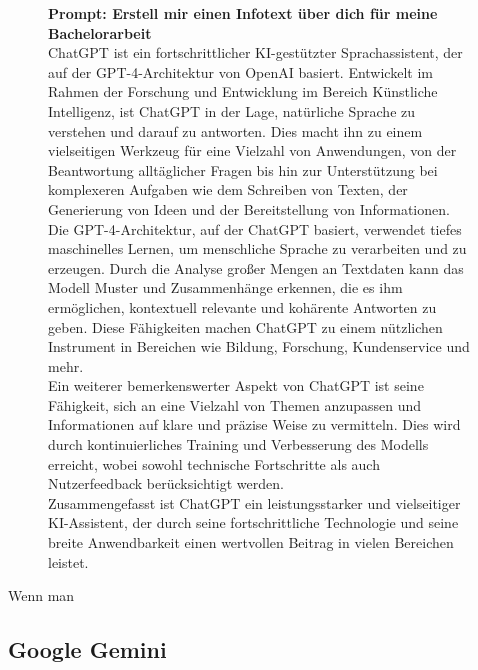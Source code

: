 \begin{figure}[H] 
    \begin{tcolorbox}[colback=gray!20, colframe=gray!20, boxrule=0pt, sharp corners] 
    \textbf{Prompt: Erstell mir einen Infotext über dich für meine Bachelorarbeit}\\ 

    ChatGPT ist ein fortschrittlicher KI-gestützter Sprachassistent, der auf der GPT-4-Architektur von OpenAI basiert. 
    Entwickelt im Rahmen der Forschung und Entwicklung im Bereich Künstliche Intelligenz, ist ChatGPT in der Lage, 
    natürliche Sprache zu verstehen und darauf zu antworten. Dies macht ihn zu einem vielseitigen Werkzeug für eine 
    Vielzahl von Anwendungen, von der Beantwortung alltäglicher Fragen bis hin zur Unterstützung bei komplexeren 
    Aufgaben wie dem Schreiben von Texten, der Generierung von Ideen und der Bereitstellung von Informationen.\\
    
    Die GPT-4-Architektur, auf der ChatGPT basiert, verwendet tiefes maschinelles Lernen, um menschliche Sprache zu 
    verarbeiten und zu erzeugen. Durch die Analyse großer Mengen an Textdaten kann das Modell Muster und Zusammenhänge 
    erkennen, die es ihm ermöglichen, kontextuell relevante und kohärente Antworten zu geben. Diese Fähigkeiten machen 
    ChatGPT zu einem nützlichen Instrument in Bereichen wie Bildung, Forschung, Kundenservice und mehr.\\
    
    Ein weiterer bemerkenswerter Aspekt von ChatGPT ist seine Fähigkeit, sich an eine Vielzahl von Themen anzupassen 
    und Informationen auf klare und präzise Weise zu vermitteln. Dies wird durch kontinuierliches Training und 
    Verbesserung des Modells erreicht, wobei sowohl technische Fortschritte als auch Nutzerfeedback berücksichtigt 
    werden.\\
    
    Zusammengefasst ist ChatGPT ein leistungsstarker und vielseitiger KI-Assistent, der durch seine fortschrittliche 
    Technologie und seine breite Anwendbarkeit einen wertvollen Beitrag in vielen Bereichen leistet.\\
\vfill
    \end{tcolorbox}
\end{figure}

Wenn man 

\subsection{Google Gemini}  \label{Google Gemini}

